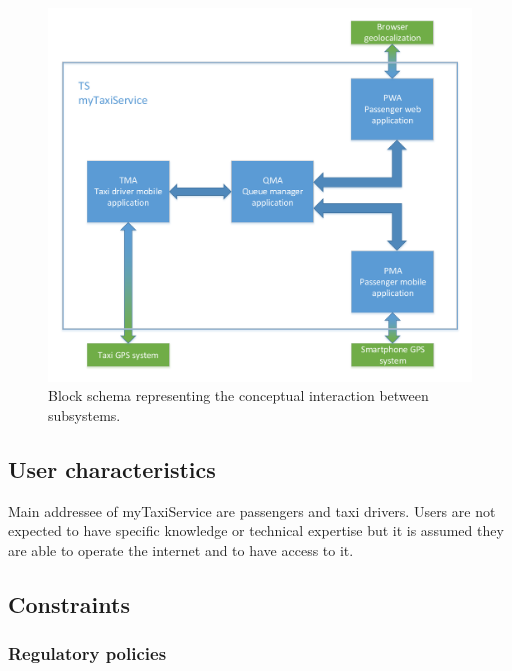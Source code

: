 \begin{figure}
\begin{centering}
\includegraphics[scale=0.5]{overall-description/Diagram}
\par\end{centering}

\protect\caption{Block schema representing the conceptual interaction between subsystems.}


\end{figure}



\subsection{User characteristics}

Main addressee of myTaxiService are passengers and taxi drivers. Users
are not expected to have specific knowledge or technical expertise
but it is assumed they are able to operate the internet and to have
access to it.


\subsection{Constraints }


\subsubsection{Regulatory policies}

